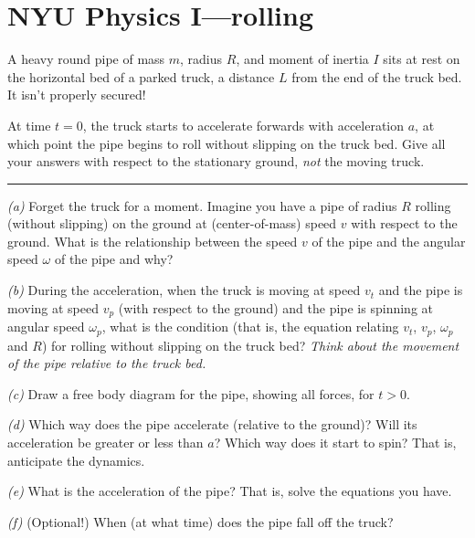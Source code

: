 \documentclass[12pt]{article}
\begin{document}
\section*{NYU Physics I---rolling}

A heavy round pipe of mass $m$, radius $R$, and moment of inertia $I$
sits at rest on the horizontal bed of a parked truck, a distance $L$
from the end of the truck bed.  It isn't properly secured!

At time $t=0$, the truck starts to
accelerate forwards with acceleration $a$, at which point the pipe
begins to roll without slipping on the truck bed.  Give all your
answers with respect to the stationary ground, {\em not} the moving
truck. \\ \rule{0.3\textwidth}{0pt}

\textsl{(a)} Forget the truck for a moment. Imagine you have a pipe
of radius $R$ rolling (without slipping) on the ground at (center-of-mass) speed $v$ with
respect to the ground. What is the relationship between the speed $v$ of the pipe
and the angular speed $\omega$ of the pipe and why?

\textsl{(b)} During the acceleration, when the truck is moving at
speed $v_t$ and the pipe is moving at speed $v_p$ (with respect to the
ground) and the pipe is spinning at angular speed $\omega_p$, what is
the condition (that is, the equation relating $v_t$, $v_p$, $\omega_p$
and $R$) for rolling without slipping on the truck bed?  \emph{Think
about the movement of the pipe relative to the truck bed.}

\textsl{(c)} Draw a free body diagram for the pipe, showing all
forces, for $t>0$.

\textsl{(d)} Which way does the pipe accelerate (relative to the
ground)?  Will its acceleration be greater or less than $a$?  Which
way does it start to spin?  That is, anticipate the dynamics.

\textsl{(e)} What is the acceleration of the pipe?  That is, solve the
equations you have.

\textsl{(f)} (Optional!) When (at what time) does the pipe fall off the truck?
\end{document}
